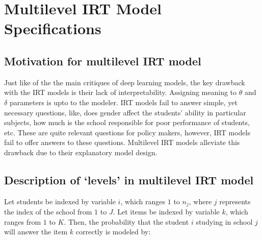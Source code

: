 \documentclass[12pt]{article}
\begin{document}
\section{Multilevel IRT Model Specifications} \label{sec:mlirt}
\subsection{Motivation for multilevel IRT model}
Just like of the the main critiques of deep learning models, the key drawback with the IRT models is their lack of interpretability. Assigning meaning to $\theta$ and $\delta$ parameters is upto to the modeler. IRT models fail to answer simple, yet necessary questions, like, does gender affect the students' ability in particular subjects, how much is the school responsible for poor performance of students, etc. These are quite relevant questions for policy makers, however, IRT models fail to offer answers to these questions. Multilevel IRT models alleviate this drawback due to their explanatory model design.

    
    

\subsection{Description of `levels' in multilevel IRT model}

Let students be indexed by variable $i$, which ranges $1$ to $n_j$, where $j$ represents the index of the school from $1$ to $J$. Let items be indexed by variable $k$, which ranges from $1$ to $K$. Then, the probability that the student $i$ studying in school $j$ will answer the item $k$ correctly is modeled by:
\end{document}
